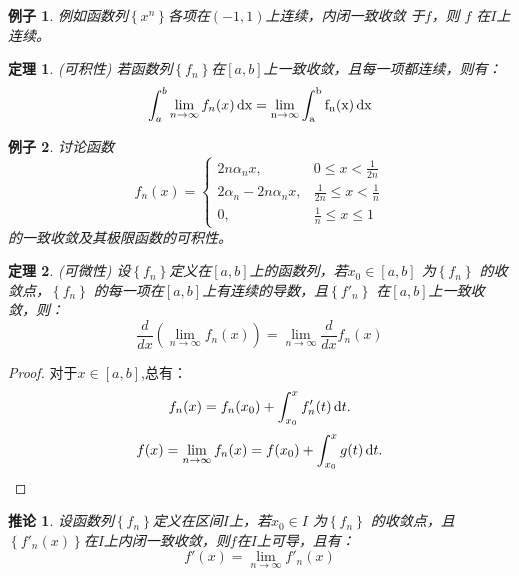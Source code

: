 \documentclass[a4paper,12pt]{article}
\newtheorem{theorem}{定理}
\newtheorem{example}{例子}
\newtheorem{corollary}{推论}
\begin{document}
\begin{example}
    例如函数列$\displaystyle \left\{x^n\right\}$各项在$(-1, 1)$上连续，内闭一致收敛
    于$f$，则 $f$ 在$I$上连续。
\end{example}

\begin{theorem}{\rm (可积性)}
    若函数列$\left\{f_n\right\}$在$[a,b]$上一致收敛，且每一项都连续，则有：
    \begin{equation}
        \int_a^b\lim_{n \to \infty}f_n(x)\,\rm{d}x = 
        \lim_{n \to \infty}\int_a^bf_n(x)\,\rm{d}x
        \label{eq:eq10}
    \end{equation}
\end{theorem}


\begin{example}
    讨论函数
    \[
        f_n(x) = \left\{\begin{array}{ll} 2n\alpha_nx,& 0 \le x < \frac{1}{2n} \\
                        2\alpha_n - 2n\alpha_nx, & \frac{1}{2n} \le x < \frac{1}{n} \\
                        0,           & \frac{1}{n} \le x \le 1
        \end{array}\right.
    \]
    的一致收敛及其极限函数的可积性。
\end{example}

\begin{theorem}{\rm(可微性)}
    设$\displaystyle \left\{f_n\right\}$定义在$[a,b]$上的函数列，若$x_0 \in [a,b]$
    为$\displaystyle \left\{f_n\right\}$ 的收敛点，$\displaystyle \left\{f_n\right\}$
    的每一项在$[a,b]$上有连续的导数，且$\displaystyle \left\{f'_n\right\}$
    在$[a,b]$上一致收敛，则：
    \begin{equation}
        \frac{d}{dx}\left(\lim_{n \to \infty}f_n(x)\right) = 
        \lim_{n \to \infty}\frac{d}{dx}f_n(x)
        \label{eq:eq11}
    \end{equation}
\end{theorem}
    \begin{proof}
        对于$x \in [a,b]$,总有：
        \[
            f_n(x) = f_n(x_0) + \int_{x_0}^xf'_n(t)\,{\rm d}t.
            \]
        \[
            f(x) = \lim_{n \to \infty}f_n(x) = f(x_0) + \int_{x_0}^xg(t)\,{\rm d}t.
            \]
    \end{proof}
\begin{corollary}
        设函数列$\displaystyle \left\{f_n\right\}$定义在区间$I$上，若$x_0 \in I$ 为$\displaystyle \left\{f_n\right\}$
        的收敛点，且$\displaystyle \left\{f'_n(x)\right\}$在$I$上内闭一致收敛，则$f$在$I$上可导，且有：
        \[
            f'(x) = \lim_{n \to \infty}f'_n(x)
            \]
\end{corollary}
\end{document}
